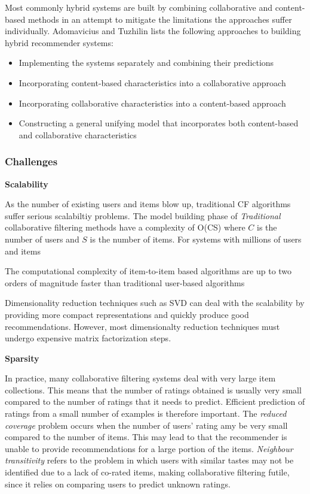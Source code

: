 Most commonly hybrid systems are built by combining collaborative and content-based methods in an attempt to mitigate the limitations the approaches suffer individually. Adomavicius and Tuzhilin \cite{Adomavicius2005} lists the following approaches to building hybrid recommender systems:

\begin{itemize}
\item Implementing the systems separately and combining their predictions
\item Incorporating content-based characteristics into a collaborative approach
\item Incorporating collaborative characteristics into a content-based approach
\item Constructing a general unifying model that incorporates both content-based and collaborative characteristics
\end{itemize}

\subsubsection{Challenges}

\textbf{Scalability}

As the number of existing users and items blow up, traditional CF algorithms suffer serious scalabiltiy problems. The model building phase of \emph{Traditional} collaborative filtering methods have a complexity of O(CS) where $C$ is the number of users and $S$ is the number of items. For systems with millions of users and items

The computational complexity of item-to-item based algorithms are up to two orders of magnitude faster than traditional user-based algorithms \cite{Deshpande2004}

Dimensionality reduction techniques such as SVD can deal with the scalability by providing more compact representations and quickly produce good recommendations. However, most dimensionalty reduction techniques must undergo expensive matrix factorization steps.

\textbf{Sparsity}

In practice, many collaborative filtering systems deal with very large item collections. This means that the number of ratings obtained is usually very small compared to the number of ratings that it needs to predict. Efficient prediction of ratings from a small number of examples is therefore important. The \emph{reduced coverage} problem occurs when the number of users' rating amy be very small compared to the number of items. This may lead to that the recommender is unable to provide recommendations for a large portion of the items. \emph{Neighbour transitivity} refers to the problem in which users with similar tastes may not be identified due to a lack of co-rated items, making collaborative filtering futile, since it relies on comparing users to predict unknown ratings.

